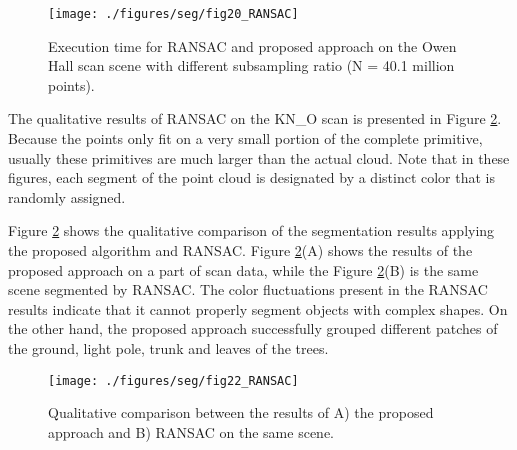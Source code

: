 \documentclass[final,3p,times,twocolumn,authoryear]{elsarticle}
\begin{document}
\begin{figure}[h]
	\centering
	\texttt{[image: ./figures/seg/fig20\_RANSAC]}
	\caption{Execution time for RANSAC and proposed approach on the Owen Hall scan scene with different subsampling ratio (N = 40.1 million points). }
	\label{fig:fig20_RANSAC}
\end{figure}

The qualitative results of RANSAC on the KN\_O scan is presented in Figure \ref{fig:fig22_RANSAC}. Because the points only fit on a very small portion of the complete primitive, usually these primitives are much larger than the actual cloud.
 Note that in these figures, each segment of the point cloud is designated by a distinct color that is randomly assigned.

Figure \ref{fig:fig22_RANSAC} shows the qualitative comparison of the segmentation results applying the proposed algorithm and RANSAC. Figure \ref{fig:fig22_RANSAC}(A) shows the results of the proposed approach on a part of scan data, while the Figure \ref{fig:fig22_RANSAC}(B) is the same scene segmented by RANSAC. The color fluctuations present in the RANSAC results indicate that it cannot properly segment objects with complex shapes.  On the other hand, the proposed approach successfully grouped different patches of the ground, light pole, trunk and leaves of the trees.  





\begin{figure}[h]
	\centering
	\texttt{[image: ./figures/seg/fig22\_RANSAC]}
	\caption{Qualitative comparison between the results of A) the proposed approach and B) RANSAC on the same scene.}
	\label{fig:fig22_RANSAC}
\end{figure}
\end{document}
